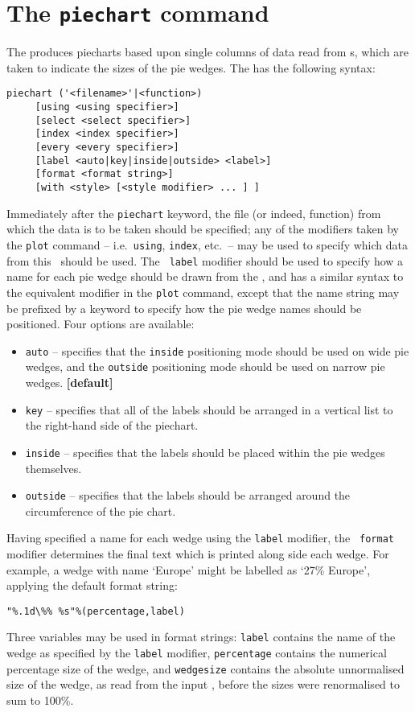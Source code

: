\section{The {\tt piechart} command}
\label{sec:piechart}

The  produces piecharts based upon single columns of data
read from \datafile s, which are taken to indicate the sizes of the pie wedges.
The  has the following syntax:
\begin{verbatim}
piechart ('<filename>'|<function>)
     [using <using specifier>]
     [select <select specifier>]
     [index <index specifier>]
     [every <every specifier>]
     [label <auto|key|inside|outside> <label>]
     [format <format string>]
     [with <style> [<style modifier> ... ] ]
\end{verbatim}

Immediately after the {\tt piechart} keyword, the file (or indeed, function)
from which the data is to be taken should be specified; any of the modifiers
taken by the {\tt plot} command -- i.e.\ {\tt using}, {\tt index}, etc.\ -- may
be used to specify which data from this \datafile\ should be used. The {\tt
label} modifier should be used to specify how a name for each pie wedge should
be drawn from the \datafile, and has a similar syntax to the equivalent
modifier in the {\tt plot} command, except that the name string may be
prefixed by a keyword to specify how the pie wedge names should be positioned.
Four options are available:

\noindent
\begin{itemize}
\item {\tt auto} -- specifies that the {\tt inside} positioning mode should be used on wide pie wedges, and the {\tt outside} positioning mode should be used on narrow pie wedges. {\bf [default]}
\item {\tt key} -- specifies that all of the labels should be arranged in a vertical list to the right-hand side of the piechart.
\item {\tt inside} -- specifies that the labels should be placed within the pie wedges themselves.
\item {\tt outside} -- specifies that the labels should be arranged around the circumference of the pie chart.
\end{itemize}

Having specified a name for each wedge using the {\tt label} modifier, the {\tt
format} modifier determines the final text which is printed along side each
wedge.  For example, a wedge with name `Europe' might be labelled as `27\%
Europe', applying the default format string:
\begin{verbatim}
"%.1d\%% %s"%(percentage,label)
\end{verbatim}
Three variables may be used in format strings: {\tt label} contains the name of
the wedge as specified by the {\tt label} modifier, {\tt percentage} contains
the numerical percentage size of the wedge, and {\tt wedgesize} contains the
absolute unnormalised size of the wedge, as read from the input \datafile,
before the sizes were renormalised to sum to 100\%.

